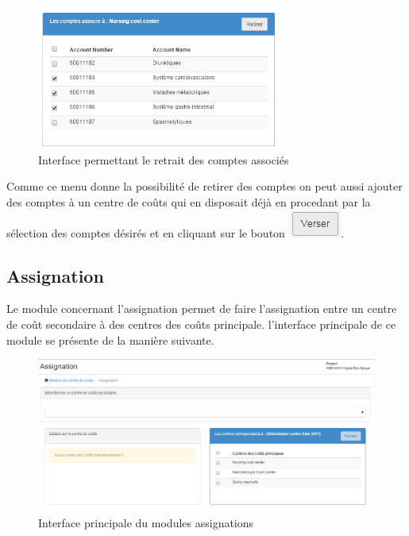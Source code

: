 \documentclass[12pt,a4paper]{report}
\begin{document}
\begin{figure}[h]
\begin{center}
\includegraphics[width=8cm]{pic/CompteAssocie.png}
\end{center}
\caption{Interface permettant le retrait des comptes associés}
\label{Interface permettant le retrait des comptes associés}
\end{figure}

Comme ce menu donne la possibilité de retirer des comptes on peut aussi ajouter des comptes à un centre de coûts qui en disposait déjà en procedant par la sélection des comptes désirés et en cliquant sur le bouton \includegraphics[scale=0.7]{pic/VerserCompte.png}.
\newpage
\subsection{Assignation}
Le module concernant l'assignation permet de faire l'assignation entre un centre de coût secondaire à des centres des coûts principale. l'interface principale de ce module se présente de la manière suivante. 

\begin{figure}[h]
\begin{center}
\includegraphics[width=12cm]{pic/AssignationInterface.png}
\end{center}
\caption{Interface principale du modules assignations}
\label{Interface principale du modules assignations}
\end{figure}
\end{document}
